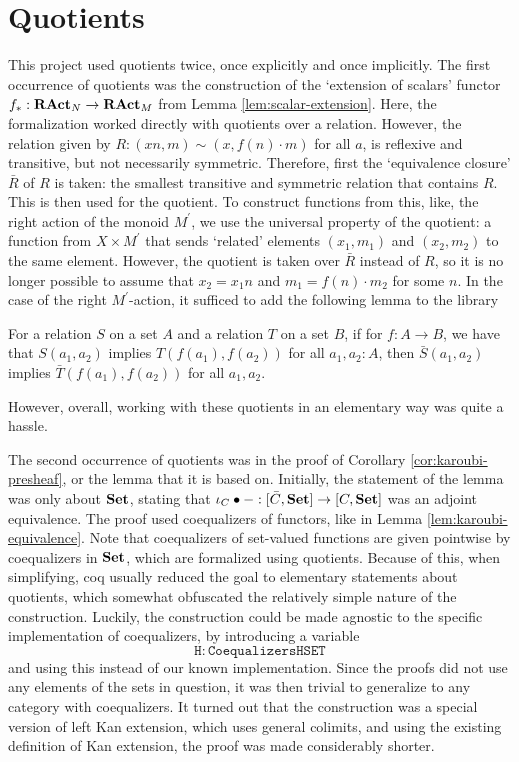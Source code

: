 \section{Quotients}\label{sec:quotients}
This project used quotients twice, once explicitly and once implicitly. The first occurrence of quotients was the construction of the `extension of scalars' functor $ f_*: \mathbf{RAct}_{N} \to \mathbf{RAct}_{M} $ from Lemma \ref{lem:scalar-extension}. Here, the formalization worked directly with quotients over a relation. However, the relation given by $ R : (x n, m) \sim (x, f(n) \cdot m) $ for all $ a $, is reflexive and transitive, but not necessarily symmetric. Therefore, first the `equivalence closure' $ \bar R $ of $ R $ is taken: the smallest transitive and symmetric relation that contains $ R $. This is then used for the quotient. To construct functions from this, like, the right action of the monoid $ M^\prime $, we use the universal property of the quotient: a function from $ X \times M^\prime $ that sends `related' elements $ (x_1, m_1) $ and $ (x_2, m_2) $ to the same element. However, the quotient is taken over $ \bar R $ instead of $ R $, so it is no longer possible to assume that $ x_2 = x_1 n $ and $ m_1 = f(n) \cdot m_2 $ for some $ n $. In the case of the right $ M^\prime $-action, it sufficed to add the following lemma to the library
\begin{lemma}
  For a relation $ S $ on a set $ A $ and a relation $ T $ on a set $ B $, if for $ f: A \to B $, we have that $ S(a_1, a_2) $ implies $ T(f(a_1), f(a_2)) $ for all $ a_1, a_2 : A $, then $ \bar S(a_1, a_2) $ implies $ \bar T(f(a_1), f(a_2)) $ for all $ a_1, a_2 $.
\end{lemma}
However, overall, working with these quotients in an elementary way was quite a hassle.

The second occurrence of quotients was in the proof of Corollary \ref{cor:karoubi-presheaf}, or the lemma that it is based on. Initially, the statement of the lemma was only about $ \mathbf{Set} $, stating that $ \iota_C \bullet - : [\bar C, \mathbf{Set}] \to [C, \mathbf{Set}] $ was an adjoint equivalence. The proof used coequalizers of functors, like in Lemma \ref{lem:karoubi-equivalence}. Note that coequalizers of set-valued functions are given pointwise by coequalizers in $ \mathbf{Set} $, which are formalized using quotients. Because of this, when simplifying, coq usually reduced the goal to elementary statements about quotients, which somewhat obfuscated the relatively simple nature of the construction. Luckily, the construction could be made agnostic to the specific implementation of coequalizers, by introducing a variable
\[ \mathtt{H : Coequalizers HSET} \]
and using this instead of our known implementation. Since the proofs did not use any elements of the sets in question, it was then trivial to generalize to any category with coequalizers. It turned out that the construction was a special version of left Kan extension, which uses general colimits, and using the existing definition of Kan extension, the proof was made considerably shorter.

